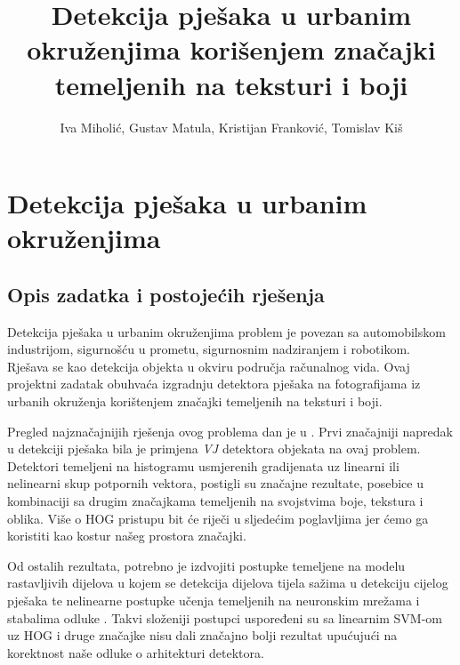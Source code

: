 \documentclass[seminar]{fer}
\title{Detekcija pješaka u urbanim okruženjima korišenjem značajki temeljenih na teksturi i boji}
\author{Iva Miholić, Gustav Matula, Kristijan Franković, Tomislav Kiš}
\begin{document}
\maketitle

\chapter{Detekcija pješaka u urbanim okruženjima}
\section{Opis zadatka i postojećih rješenja}
Detekcija pješaka u urbanim okruženjima problem je povezan sa automobilskom industrijom, sigurnošću u prometu, sigurnosnim nadziranjem i robotikom. Rješava se kao detekcija objekta u okviru područja računalnog vida. Ovaj projektni zadatak obuhvaća izgradnju detektora pješaka na fotografijama iz urbanih okruženja korištenjem značajki temeljenih na teksturi i boji.

Pregled najznačajnijih rješenja ovog problema dan je u \cite{BenensonOHS14}. Prvi značajniji napredak u detekciji pješaka bila je primjena \emph{VJ} detektora objekata \cite{VJ} na ovaj problem. Detektori temeljeni na histogramu usmjerenih gradijenata  \cite{HOG}  uz linearni ili nelinearni skup potpornih vektora, postigli su značajne rezultate, posebice u kombinaciji sa drugim značajkama temeljenih na svojstvima boje, tekstura i oblika. Više o HOG pristupu bit će riječi u sljedećim poglavljima jer ćemo ga koristiti kao kostur našeg prostora značajki.

Od ostalih rezultata, potrebno je izdvojiti postupke temeljene na modelu rastavljivih dijelova   u kojem se detekcija dijelova tijela sažima u detekciju cijelog pješaka te nelinearne postupke učenja temeljenih na neuronskim mrežama i stabalima odluke \cite{BenensonOHS14}. Takvi složeniji postupci uspoređeni su sa linearnim SVM-om uz HOG i druge značajke nisu dali značajno bolji rezultat upućujući na korektnost naše odluke o arhitekturi detektora.
\end{document}
